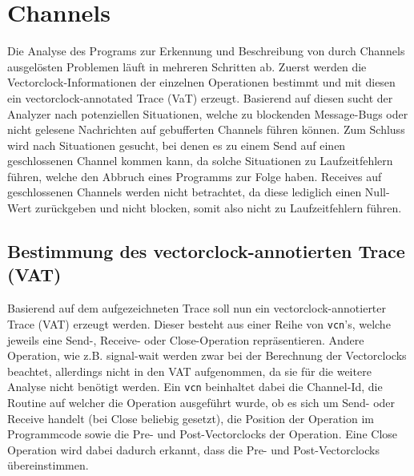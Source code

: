 \section{Channels}\label{Chap:Analyse-Sec:Channel}
Die Analyse des Programs zur Erkennung und Beschreibung von durch Channels ausgelösten 
Problemen läuft in mehreren Schritten ab. Zuerst werden die Vectorclock-Informationen 
der einzelnen Operationen bestimmt und mit diesen ein vectorclock-annotated Trace 
(VaT) erzeugt. Basierend auf diesen sucht der Analyzer nach potenziellen 
Situationen, welche zu blockenden Message-Bugs oder nicht gelesene
Nachrichten auf gebufferten Channels führen können. Zum Schluss 
wird nach Situationen gesucht, bei denen es zu einem Send auf einen 
geschlossenen Channel kommen kann, da solche Situationen zu Laufzeitfehlern 
führen, welche den Abbruch eines Programms zur Folge haben.
Receives auf geschlossenen Channels werden nicht betrachtet, da diese 
lediglich einen Null-Wert zurückgeben und nicht blocken, somit also nicht 
zu Laufzeitfehlern führen. 

\subsection{Bestimmung des vectorclock-annotierten Trace (VAT)}
Basierend auf dem aufgezeichneten Trace soll nun ein vectorclock-annotierter Trace 
(VAT) erzeugt werden. Dieser besteht aus einer Reihe von \texttt{vcn}'s, 
welche jeweils eine Send-, Receive- oder Close-Operation repräsentieren.
Andere Operation, wie z.B. signal-wait werden zwar bei der Berechnung der Vectorclocks 
beachtet, allerdings nicht in den VAT aufgenommen, da sie für die weitere 
Analyse nicht benötigt werden. Ein \texttt{vcn} beinhaltet dabei die Channel-Id,
die Routine auf welcher die Operation ausgeführt wurde, 
ob es sich um Send- oder Receive handelt (bei Close beliebig gesetzt), 
die Position der Operation im Programmcode
sowie die Pre- und Post-Vectorclocks der Operation. Eine Close Operation 
wird dabei dadurch erkannt, dass die Pre- und Post-Vectorclocks übereinstimmen.

